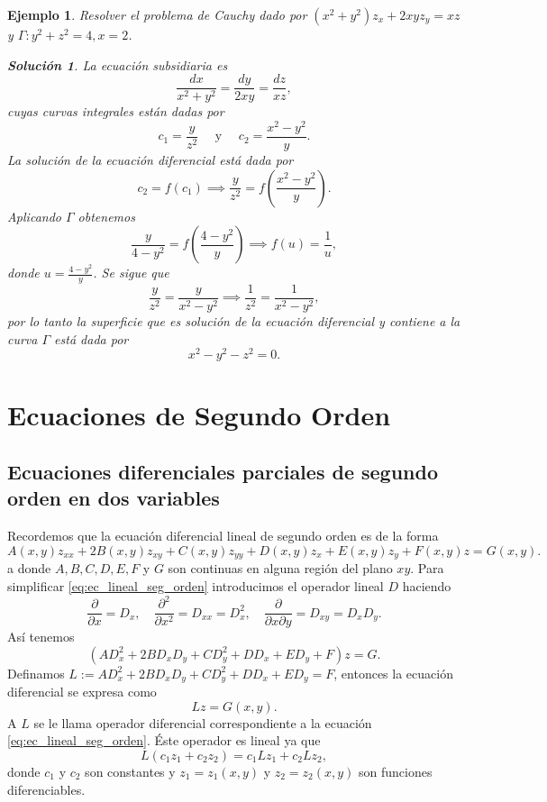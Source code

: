 \documentclass[11pt,letterpaper]{report}
\newtheorem{example}[defn]{Ejemplo}
\newtheorem*{sol}{Solución}
\newcommand\<{\langle}
\renewcommand\>{\rangle}
\begin{document}
\begin{example}
  Resolver el problema de Cauchy dado por $(x^2+y^2) z_x +
  2xy z_y = xz$ y $\Gamma : y^2 + z^2 = 4, x = 2$.
  \begin{sol}
    La ecuación subsidiaria es
    \[
    \frac{dx}{x^2+y^2} = \frac{dy}{2xy} = \frac{dz}{xz},
    \] 
    cuyas curvas integrales están dadas por
    \[
    c_1 = \frac{y}{z^2} \quad \text{ y } \quad c_2 =
    \frac{x^2-y^2}{y}.
    \] 
    La solución de la ecuación diferencial está dada por
    \[
    c_2 = f(c_1) \implies \frac{y}{z^2} =
    f\left(\frac{x^2-y^2}{y}\right).
    \] 
    Aplicando $\Gamma$ obtenemos
    \[
    \frac{y}{4-y^2} = f\left(\frac{4-y^2}{y}\right) \implies
    f(u) = \frac{1}{u},
    \] 
    donde $u = \frac{4-y^2}{y}$. Se sigue que
    \[
    \frac{y}{z^2} = \frac{y}{x^2-y^2} \implies \frac{1}{z^2}
    = \frac{1}{x^2-y^2},
    \] 
    por lo tanto la superficie que es solución de la
    ecuación diferencial y contiene a la curva $\Gamma$ está
    dada por
    \[
    x^2 - y^2 - z^2 = 0.
    \] 
  \end{sol}
\end{example}

\chapter{Ecuaciones de Segundo Orden}

\section{Ecuaciones diferenciales parciales de segundo orden
  en dos variables}

Recordemos que la ecuación diferencial lineal de segundo
orden es de la forma
\begin{equation}
  \label{eq:ec_lineal_seg_orden}
  A(x,y) z_{xx} + 2B(x,y)z_{xy} + C(x,y) z_{yy} + D(x,y) z_x
  + E(x,y) z_y + F(x,y) z = G(x,y).
\end{equation}a
donde $A,B,C,D,E,F$ y $G$ son continuas en alguna región del
plano $xy$. Para simplificar \ref{eq:ec_lineal_seg_orden}
introducimos el operador lineal $D$ haciendo
\[
\frac{\partial}{\partial x} = D_x, \quad
\frac{\partial^2}{\partial x^2} = D_{xx} = D_x^2, \quad
\frac{\partial}{\partial x \partial y} = D_{xy} = D_x D_y.
\] 
Así tenemos
\[
  (AD_x^2 + 2BD_xD_y + CD_y^2 + DD_x + ED_y + F)z = G.
\] 
Definamos $L := AD_x^2 + 2BD_xD_y + CD_y^2 + D D_x + ED_y =
F$, entonces la ecuación diferencial se expresa como
\begin{equation}
  \label{eq:ec_expr_diferencial}
  Lz = G(x,y).
\end{equation}
A $L$ se le llama operador diferencial correspondiente a la
ecuación \ref{eq:ec_lineal_seg_orden}. Éste operador es
lineal ya que
\[
L(c_1z_1 + c_2z_2) = c_1 Lz_1 + c_2 Lz_2,
\] 
donde $c_1$ y $c_2$ son constantes y $z_1 = z_1(x,y)$ y
$z_2 = z_2(x,y)$ son funciones diferenciables.
\end{document}
